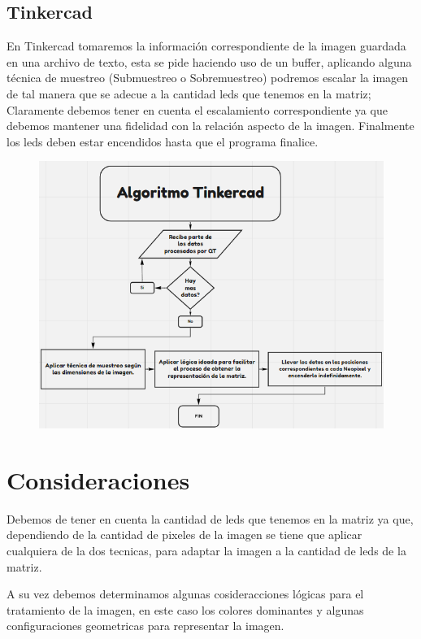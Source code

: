 \documentclass{article}
\begin{document}
    \newpage
    
    \subsection{Tinkercad}
    \begin{flushleft}
    En Tinkercad tomaremos la información correspondiente de la imagen guardada en una archivo de texto, esta se pide haciendo uso de un buffer, aplicando alguna técnica de muestreo (Submuestreo o Sobremuestreo) podremos escalar la imagen de tal manera que se adecue a la cantidad leds que tenemos en la matriz; Claramente debemos tener en cuenta el escalamiento correspondiente ya que debemos mantener una fidelidad con la relación aspecto de la imagen. Finalmente los leds deben estar encendidos hasta que el programa finalice.
    
    \end{flushleft}
    
    \vspace{0.2cm}
            
    \begin{figure}[h]
    \includegraphics[width=12cm]{Imagenes/diagrama_tinker.png}
    \centering
    \label{fig:ram}
    \end{figure}
    \vspace{0.3cm}
    
\section{Consideraciones}
\label{consideraciones}
    \begin{flushleft}
        Debemos de tener en cuenta la cantidad de leds que tenemos en la matriz ya que, dependiendo de la cantidad de pixeles de la imagen se tiene que aplicar cualquiera de la dos tecnicas, para adaptar la imagen a la cantidad de leds de la matriz.
        
        \vspace*{0.1cm}
        
        A su vez debemos determinamos algunas cosideracciones lógicas para el tratamiento de la imagen, en este caso los colores dominantes y algunas configuraciones geometricas para representar la imagen.
    \end{flushleft}
    

\vfill

\end{document}
